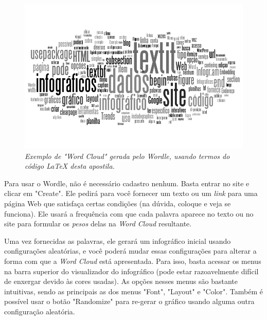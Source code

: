 \documentclass[12pt,onecolumn]{article}
\begin{document}
    \begin{figure}[ht]
      \centering
      \includegraphics[width=.9\linewidth]{wordle-1.png}
      \caption{
        \footnotesize
        \it
        Exemplo de "Word Cloud" gerada pelo Wordle, usando termos do código
        LaTeX desta apostila.
      }
      \label{fig:wordle-1}
    \end{figure}
    
    Para usar o Wordle, não é necessário cadastro nenhum. Basta entrar no site e
    clicar em "Create". Ele pedirá para você fornecer um texto ou um
    \textit{link} para uma página Web que satisfaça certas condições (na dúvida,
    coloque e veja se funciona). Ele usará a frequência com que cada palavra
    aparece no texto ou no site para formular os \textit{pesos} delas na
    \textit{Word Cloud} resultante.
    
    Uma vez fornecidas as palavras, ele gerará um infográfico inicial usando
    configurações aleatórias, e você poderá mudar essas configurações para
    alterar a forma com que a \textit{Word Cloud} está apresentada. Para isso,
    basta acessar os menus na barra superior do visualizador do infográfico
    (pode estar razoavelmente difícil de enxergar devido às cores usadas). As
    opções nesses menus são bastante intuitivas, sendo as principais as dos
    menus "Font", "Layout" e "Color". Também é possível usar o botão "Randomize"
    para re-gerar o gráfico usando alguma outra configuração aleatória.
    
\end{document}
